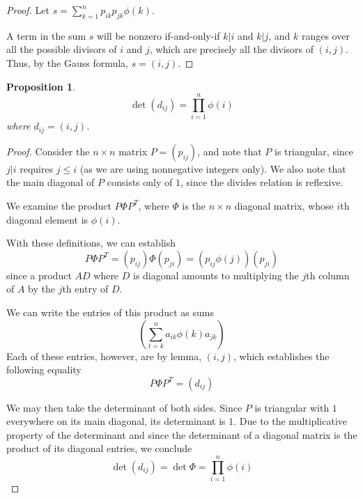 \documentclass{article}
\newtheorem{proposition}{Proposition}
\begin{document}
\begin{proof}
    Let $s = \sum_{k=1}^n {p_{ik} p_{jk} \phi(k)}$.

    A term in the sum $s$ will be nonzero if-and-only-if $k|i$ and $k|j$, and
    $k$ ranges over all the possible divisors of $i$ and $j$, which are
    precisely all the divisors of $(i, j)$. Thus, by the Gauss formula, $s =
    (i, j)$.
\end{proof}

\begin{proposition}
    $$
    \det {(d_{ij})} = \prod_{i=1}^n {\phi{(i)}}
    $$
    where $d_{ij} = (i, j)$.
\end{proposition}

\begin{proof}
    Consider the $n \times n$ matrix $P = (p_{ij})$, and note that $P$ is
    triangular, since $j|i$ requires $j \leq i$ (as we are using nonnegative
    integers only). We also note that the main diagonal of $P$ consists only of
    $1$, since the divides relation is reflexive.

    We examine the product $P\Phi P^T$, where $\Phi$ is the $n \times n$
    diagonal matrix, whose $i$th diagonal element is $\phi{(i)}$.

    With these definitions, we can establish
    $$P\Phi P^T = (p_{ij})\Phi (p_{ji}) = (p_{ij} \phi{(j)}) (p_{ji})$$
    since a product $AD$ where $D$ is diagonal amounts to multiplying the $j$th
    column of $A$ by the $j$th entry of $D$.

    We can write the entries of this product as sums
    $$\left(\sum_{t=k}^n {a_{ik} \phi{(k)} a_{jk}}\right)$$
    Each of these entries, however, are by lemma, $(i, j)$, which establishes
    the following equality
    $$P\Phi P^T = (d_{ij})$$

    We may then take the determinant of both sides. Since $P$ is triangular
    with $1$ everywhere on its main diagonal, its determinant is $1$. Due to
    the multiplicative property of the determinant and since the determinant of
    a diagonal matrix is the product of its diagonal entries, we conclude
    $$\det {(d_{ij})} = \det \Phi = \prod_{i=1}^n {\phi{(i)}}$$
\end{proof}
\end{document}
